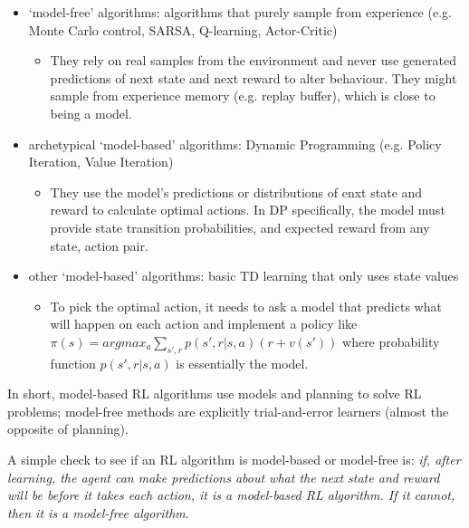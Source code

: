 \documentclass[lang=en,mode=normal,device=normal,color=blue,12pt]{elegantnote}
\DeclareMathOperator*{\1}{\mathbbm{1}}
\begin{document}
\begin{appendices}
\begin{itemize}
\item `model-free' algorithms: algorithms that purely sample from experience (e.g. Monte Carlo control, SARSA, Q-learning, Actor-Critic)
\begin{itemize}
\item They rely on real samples from the environment and never use generated predictions of next state and next reward to alter behaviour. They might sample from experience memory (e.g. replay buffer), which is close to being a model.
\end{itemize}
\item archetypical `model-based' algorithms: Dynamic Programming (e.g. Policy Iteration, Value Iteration)
\begin{itemize}
\item They use the model's predictions or distributions of enxt state and reward to calculate optimal actions. In DP specifically, the model must provide state transition probabilities, and expected reward from any state, action pair.
\end{itemize}
\item other `model-based' algorithms: basic TD learning that only uses state values
\begin{itemize}
\item To pick the optimal action, it needs to ask a model that predicts what will happen on each action and implement a policy like $\pi(s) = argmax_a \sum_{s',r} p(s',r|s,a)(r+v(s'))$ where probability function $p(s',r|s,a)$ is essentially the model.
\end{itemize}
\end{itemize}

In short, model-based RL algorithms use models and planning to solve RL problems; model-free methods are explicitly trial-and-error learners (almost the opposite of planning).

A simple check to see if an RL algorithm is model-based or model-free is: \textit{if, after learning, the agent can make predictions about what the next state and reward will be before it takes each action, it is a model-based RL algorithm. If it cannot, then it is a model-free algorithm}.




\end{appendices}
\end{document}
